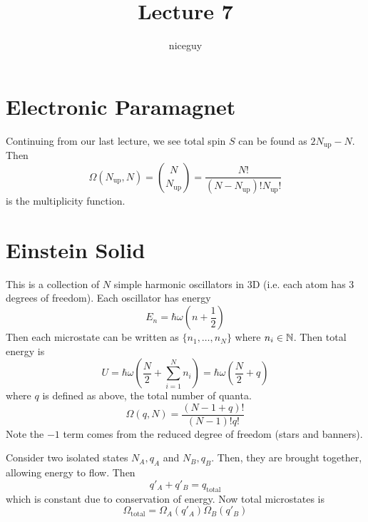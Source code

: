 \documentclass[12pt]{article}
\title{Lecture 7}
\author{niceguy}
\begin{document}
\maketitle

\section{Electronic Paramagnet}

Continuing from our last lecture, we see total spin $S$ can be found as $2N_{\text{up}} - N$. Then
$$\Omega(N_{\text{up}},N) = \binom{N}{N_{\text{up}}} = \frac{N!}{(N-N_{\text{up}})!N_{\text{up}}!}$$
is the multiplicity function. 

\section{Einstein Solid}

This is a collection of $N$ simple harmonic oscillators in 3D (i.e. each atom has 3 degrees of freedom). Each oscillator has energy
$$E_n = \hbar\omega\left(n+\frac{1}{2}\right)$$
Then each microstate can be written as $\{n_1,\dots,n_N\}$ where $n_i \in \mathbb{N}$. Then total energy is
$$U = \hbar\omega\left(\frac{N}{2} + \sum_{i=1}^N n_i\right) = \hbar\omega\left(\frac{N}{2}+q\right)$$
where $q$ is defined as above, the total number of quanta.
$$\Omega(q,N) = \frac{(N-1+q)!}{(N-1)!q!}$$
Note the $-1$ term comes from the reduced degree of freedom (stars and banners).

\begin{ex}
	Consider two isolated states $N_A,q_A$ and $N_B,q_B$. Then, they are brought together, allowing energy to flow. Then
	$$q'_A + q'_B = q_{\text{total}}$$
	which is constant due to conservation of energy. Now total microstates is
	$$\Omega_{\text{total}} = \Omega_A(q'_A)\Omega_B(q'_B)$$
\end{ex}
\end{document}
